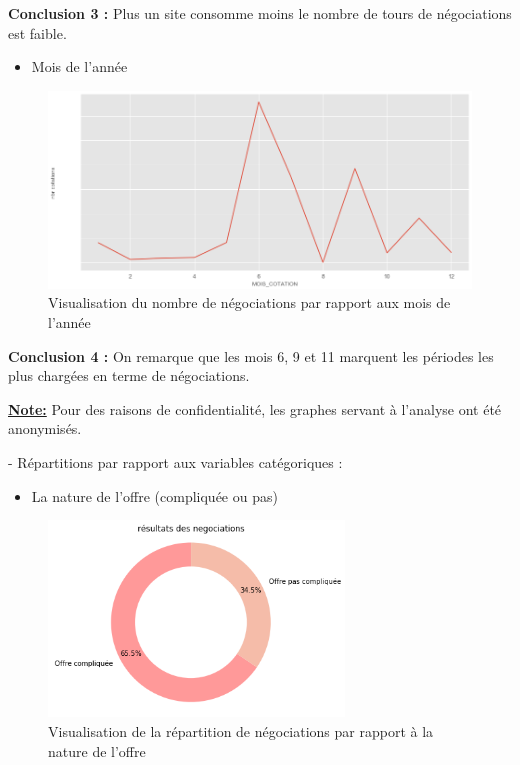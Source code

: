 \documentclass[12pt]{article}
\begin{document}
{%
{\bf Conclusion 3 :} Plus un site consomme moins le nombre de tours de négociations est faible.

\begin{itemize}
\item Mois de l’année
\end{itemize}


\begin{figure}[H]
	\centering
    \includegraphics[width=1\textwidth]{image28.png}
     \caption{ Visualisation du nombre de négociations par rapport aux mois de l’année}
    \label{fig:28}
\end{figure}

{\bf Conclusion 4 :} On remarque que les mois 6, 9 et 11 marquent les périodes les plus chargées en terme de négociations.

\underline{\bf Note:} Pour des raisons de confidentialité, les graphes servant à l’analyse ont été anonymisés.

-  Répartitions par rapport aux variables catégoriques :
\begin{itemize}
\item La nature de l’offre (compliquée ou pas)
\end{itemize}


\begin{figure}[H]
	\centering
    \includegraphics[width=0.7\textwidth]{image29.png}
     \caption{ Visualisation de la répartition de négociations par rapport à la nature de l'offre}
    \label{fig:29}
\end{figure}

}
\end{document}
